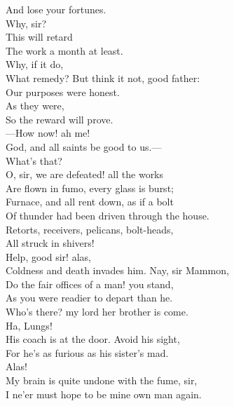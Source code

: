 \documentclass[a4paper,oneside]{memoir}
\begin{document}
\begin{drama*}
And lose your fortunes.\\
\mammonspeaks {} Why, sir?\\
\subtlespeaks {} This will retard\\
The work a month at least.\\
\mammonspeaks {} Why, if it do,\\
What remedy? But think it not, good father:\\
Our purposes were honest.\\
\subtlespeaks {} As they were,\\
So the reward will prove.\\
---How now! ah me!\\
God, and all saints be good to us.---\\
What's that?\\
\facespeaks {} O, sir, we are defeated! all the works\\
Are flown in fumo, every glass is burst;\\
Furnace, and all rent down, as if a bolt\\
Of thunder had been driven through the house.\\
Retorts, receivers, pelicans, bolt-heads,\\
All struck in shivers!\\
Help, good sir! alas,\\
Coldness and death invades him. Nay, sir Mammon,\\
Do the fair offices of a man! you stand,\\
As you were readier to depart than he.\\
Who's there? my lord her brother is come.\\
\mammonspeaks {} Ha, Lungs!\\
\facespeaks His coach is at the door. Avoid his sight,\\
For he's as furious as his sister's mad.\\
\mammonspeaks Alas!\\
\facespeaks {} My brain is quite undone with the fume, sir,\\
I ne'er must hope to be mine own man again.\\

\end{drama*}
\end{document}
